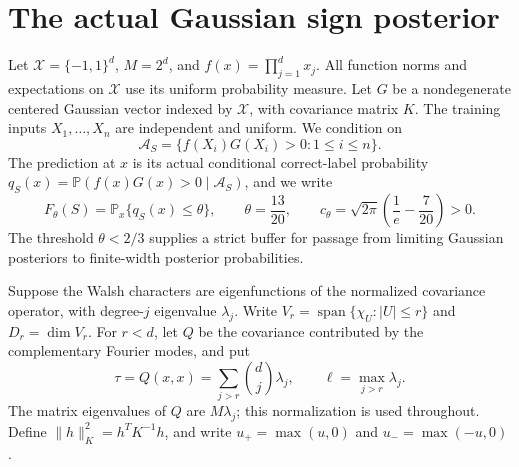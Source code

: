 
\section{The actual Gaussian sign posterior}
Let $\mathcal X=\{-1,1\}^d$, $M=2^d$, and
$f(x)=\prod_{j=1}^d x_j$. All function norms and expectations on
$\mathcal X$ use its uniform probability measure. Let $G$ be a
nondegenerate centered Gaussian vector indexed by $\mathcal X$, with
covariance matrix $K$. The training inputs $X_1,\ldots,X_n$ are independent
and uniform. We condition on
\[
 \mathcal A_S=\{f(X_i)G(X_i)>0:1\le i\le n\}.
\]
The prediction at $x$ is its actual conditional correct-label probability
$q_S(x)=\mathbb P(f(x)G(x)>0\mid\mathcal A_S)$, and we write
\[
 F_\theta(S)=\mathbb P_x\{q_S(x)\le\theta\},\qquad
 \theta=\frac{13}{20},\qquad
 c_\theta=\sqrt{2\pi}\left(\frac1e-\frac7{20}\right)>0.
\]
The threshold $\theta<2/3$ supplies a strict buffer for passage from
limiting Gaussian posteriors to finite-width posterior probabilities.

Suppose the Walsh characters are eigenfunctions of the normalized
covariance operator, with degree-$j$ eigenvalue $\lambda_j$. Write
$V_r=\operatorname{span}\{\chi_U:|U|\le r\}$ and $D_r=\dim V_r$.
For $r<d$, let $Q$ be the covariance contributed by the complementary
Fourier modes, and put
\[
 \tau=Q(x,x)=\sum_{j>r}\binom dj\lambda_j,
 \qquad \ell=\max_{j>r}\lambda_j.
\]
The matrix eigenvalues of $Q$ are $M\lambda_j$; this normalization is
used throughout. Define $\|h\|_K^2=h^TK^{-1}h$, and write $u_+=\max(u,0)$ and $u_-=\max(-u,0)$.

